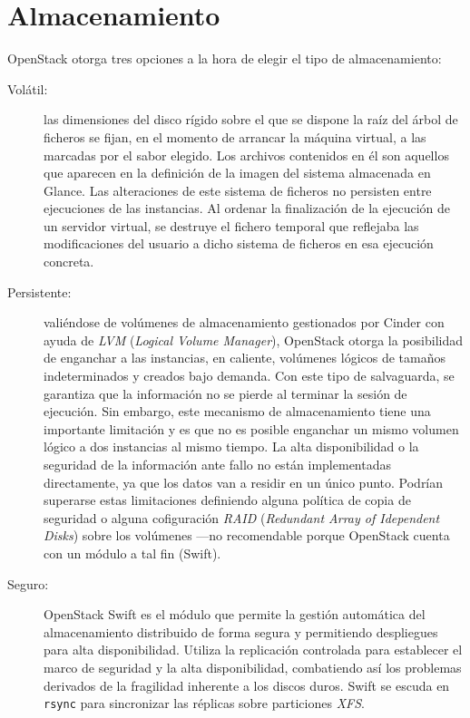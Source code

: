 \section{Almacenamiento}\label{sec:almacenamiento}
\noindent OpenStack otorga tres opciones a la hora de elegir el tipo de almacenamiento:
\begin{description}
 \item[Vol\'atil:] las dimensiones del disco r\'igido sobre el que se dispone la ra\'iz del \'arbol de ficheros se fijan, en el momento de arrancar la m\'aquina virtual, a las marcadas por el sabor elegido. Los archivos contenidos en \'el son aquellos que aparecen en la definici\'on de la imagen del sistema almacenada en Glance. Las alteraciones de este sistema de ficheros no persisten entre ejecuciones de las instancias. Al ordenar la finalizaci\'on de la ejecuci\'on de un servidor virtual, se destruye el fichero temporal que reflejaba las modificaciones del usuario a dicho sistema de ficheros en esa ejecuci\'on concreta.
 \item[Persistente:] vali\'endose de vol\'umenes de almacenamiento gestionados por Cinder con ayuda de \emph{LVM} (\emph{Logical Volume Manager}), OpenStack otorga la posibilidad de enganchar a las instancias, en caliente, vol\'umenes l\'ogicos de tama\~nos indeterminados y creados bajo demanda. Con este tipo de salvaguarda, se garantiza que la informaci\'on no se pierde al terminar la sesi\'on de ejecuci\'on. Sin embargo, este mecanismo de almacenamiento tiene una importante limitaci\'on y es que no es posible enganchar un mismo volumen l\'ogico a dos instancias al mismo tiempo. La alta disponibilidad o la seguridad de la informaci\'on ante fallo no est\'an implementadas directamente, ya que los datos van a residir en un \'unico punto. Podr\'ian superarse estas limitaciones definiendo alguna pol\'itica de copia de seguridad o alguna cofiguraci\'on \emph{RAID} (\emph{Redundant Array of Idependent Disks}) sobre los vol\'umenes ---no recomendable porque OpenStack cuenta con un m\'odulo a tal fin (Swift).
 \item[Seguro:] OpenStack Swift es el m\'odulo que permite la gesti\'on autom\'atica del almacenamiento distribuido de forma segura y permitiendo despliegues para alta disponibilidad. Utiliza la replicaci\'on controlada para establecer el marco de seguridad y la alta disponibilidad, combatiendo as\'i los problemas derivados de la fragilidad inherente a los discos duros. Swift se escuda en \texttt{rsync} para sincronizar las r\'eplicas sobre particiones \emph{XFS}.
\end{description}
 
